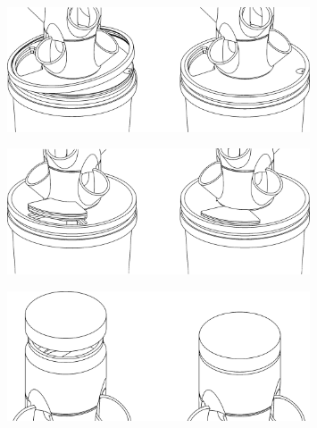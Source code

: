 \begin{enumerate}
\begin{figure}[h]
    \centering
    \includegraphics[width=0.8\textwidth]{images/50mm/50mm_assembly_9.png}
    \caption*{}
    \label{fig:50mm-nine}
\end{figure}
\begin{figure}[h]
    \centering
    \includegraphics[width=0.8\textwidth]{images/50mm/50mm_assembly_10.png}
    \caption*{}
    \label{fig:50mm-ten}
\end{figure}
\begin{figure}[h!]
    \centering
    \includegraphics[width=0.8\textwidth]{images/50mm/50mm_assembly_11.png}
    \caption*{}
    \label{fig:50mm-eleven}
\end{figure}

\end{enumerate}

\setlength{\intextsep}{12.0pt plus 2.0pt minus 2.0pt}
\setlength{\floatsep}{12.0pt plus 2.0pt minus 2.0pt}
\setlength{\textfloatsep}{20.0pt plus 2.0pt minus 4.0pt}
\setlength{\belowcaptionskip}{0.0pt}
